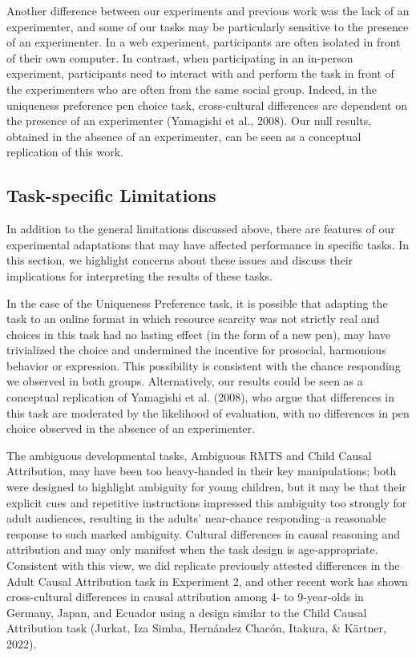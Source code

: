 \documentclass[
  man,floatsintext]{apa6}
\begin{document}
Another difference between our experiments and previous work was the lack of an experimenter, and some of our tasks may be particularly sensitive to the presence of an experimenter. In a web experiment, participants are often isolated in front of their own computer. In contrast, when participating in an in-person experiment, participants need to interact with and perform the task in front of the experimenters who are often from the same social group. Indeed, in the uniqueness preference pen choice task, cross-cultural differences are dependent on the presence of an experimenter (Yamagishi et al., 2008). Our null results, obtained in the absence of an experimenter, can be seen as a conceptual replication of this work.

\hypertarget{task-specific-limitations}{%
\subsection{Task-specific Limitations}\label{task-specific-limitations}}

In addition to the general limitations discussed above, there are features of our experimental adaptations that may have affected performance in specific tasks. In this section, we highlight concerns about these issues and discuss their implications for interpreting the results of these tasks.

In the case of the Uniqueness Preference task, it is possible that adapting the task to an online format in which resource scarcity was not strictly real and choices in this task had no lasting effect (in the form of a new pen), may have trivialized the choice and undermined the incentive for prosocial, harmonious behavior or expression. This possibility is consistent with the chance responding we observed in both groups. Alternatively, our results could be seen as a conceptual replication of Yamagishi et al. (2008), who argue that differences in this task are moderated by the likelihood of evaluation, with no differences in pen choice observed in the absence of an experimenter.

The ambiguous developmental tasks, Ambiguous RMTS and Child Causal Attribution, may have been too heavy-handed in their key manipulations; both were designed to highlight ambiguity for young children, but it may be that their explicit cues and repetitive instructions impressed this ambiguity too strongly for adult audiences, resulting in the adults' near-chance responding--a reasonable response to such marked ambiguity. Cultural differences in causal reasoning and attribution and may only manifest when the task design is age-appropriate. Consistent with this view, we did replicate previously attested differences in the Adult Causal Attribution task in Experiment 2, and other recent work has shown cross-cultural differences in causal attribution among 4- to 9-year-olds in Germany, Japan, and Ecuador using a design similar to the Child Causal Attribution task (Jurkat, Iza Simba, Hernández Chacón, Itakura, \& Kärtner, 2022).
\end{document}
